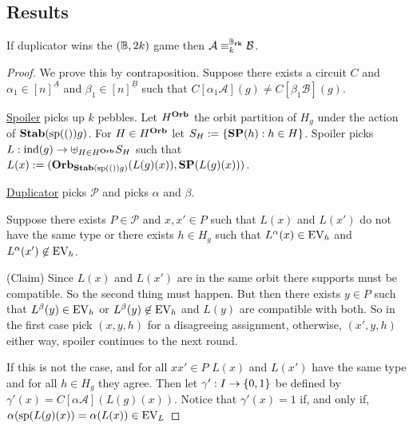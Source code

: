 \documentclass[../main/thesis.tex]{subfiles}
\begin{document}
\subsection{Results}

\begin{lem}
  If duplicator wins the $(\mathbb{B}, 2k)$ game then $\mathcal{A}
  \equiv^{\mathbb{B}_{\text{\textbf{rk}}}}_{k} \mathcal{B}$.
\end{lem}
\begin{proof}
  We prove this by contraposition. Suppose there exists a circuit $C$ and
  $\alpha_1 \in [n]^{\underline{A}}$ and $\beta_1 \in [n]^{\underline{B}}$ such
  that $C[\alpha_1 \mathcal{A}](g) \neq C[\beta_1 \mathcal{B}](g)$.


  \underline{Spoiler} picks up $k$ pebbles. Let $H^{\text{\textbf{Orb}}}$ the orbit partition of
  $H_g$ under the action of $\text{\textbf{Stab}} (\text{sp} (())g)$. For $H \in H^{\text{\textbf{Orb}}}$ let $S_{H} :=
  \{\text{\textbf{SP}}(h) : h \in H\}$. Spoiler picks $L : \text{\upshape ind}(g) \rightarrow \uplus_{H \in H^{\text{\textbf{Orb}}}}
  S_H$ such that $L (x) := (\text{\textbf{Orb}}_{\text{\textbf{Stab}} (\text{sp} (())g)}(L(g)(x)), \text{\textbf{SP}}(L(g)(x)))$.

  \underline{Duplicator} picks $\mathcal{P}$ and picks $\alpha$ and $\beta$.

  Suppose there exists $P \in \mathcal{P}$ and $x, x' \in P$ such that $L(x)$
  and $L(x')$ do not have the same type or there exists $h \in H_g$ such that
  $L^{\alpha}(x) \in \text{EV}_h$ and $L^{\alpha}(x') \not\in \text{EV}_h$.

  (Claim) Since $L(x)$ and $L(x')$ are in the same orbit there supports must be
  compatible. So the second thing must happen. But then there exists $y \in P$
  such that $L^{\beta}(y) \in \text{EV}_h$ or $L^{\beta}(y) \not\in \text{EV}_h$ and $L(y)$
  are compatible with both. So in the first case pick $(x, y, h)$ for a
  disagreeing assignment, otherwise, $(x', y, h)$ either way, spoiler continues
  to the next round.

  If this is not the case, and for all $x x' \in P$ $L(x)$ and $L(x')$ have the
  same type and for all $h \in H_g$ they agree. Then let $\gamma' : I \rightarrow
  \{0,1\}$ be defined by $\gamma'(x) = C[\alpha \mathcal{A}](L(g)(x))$. Notice
  that $\gamma'(x) = 1$ if, and only if, $\alpha (\text{sp}(L(g)(x)) = \alpha(L(x))
  \in \text{EV}_{L}$






\end{proof}
\end{document}
